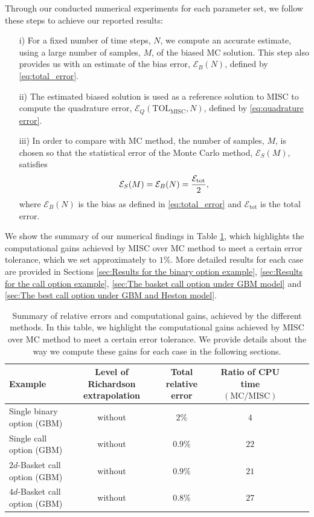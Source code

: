 Through our conducted numerical experiments for each parameter set, we follow these steps to achieve our reported results:
\begin{enumerate}
\item[i)] For a fixed number of time steps, $N$, we compute an accurate estimate, using a large number of samples, $M$, of the biased  MC solution. This step also provides us with an estimate of the bias error, $\mathcal{E}_B(N)$, defined by \eqref{eq:total_error}. 
\item[ii)] The estimated  biased solution is used as a reference solution  to MISC to compute the quadrature error, $\mathcal{E}_Q(\text{TOL}_{\text{MISC}},N)$, defined by \eqref{eq:quadrature error}.
\item[iii)] In order to compare with MC method, the number of samples, $M$, is chosen so that  the statistical error of the Monte Carlo  method, $\mathcal{E}_S(M)$, satisfies
\begin{align}\label{optimal_number_samples}
\mathcal{E}_S(M)= \mathcal{E}_B(N)=\frac{\mathcal{E}_{\text{tot}}}{2},
\end{align}
where $\mathcal{E}_B(N)$ is the bias as defined in \eqref{eq:total_error} and
$\mathcal{E}_{\text{tot}}$ is the total error. 
\end{enumerate}
We show  the summary of our numerical findings in Table \ref{table:Summary of our numerical results.}, which  highlights the computational gains achieved by MISC over MC method to meet a certain error tolerance, which we set approximately to $1\%$. More detailed results for each case  are provided in  Sections \ref{sec:Results for the binary option example}, \ref{sec:Results for the call option example}, \ref{sec:The basket call option  under GBM  model} and \ref{sec:The best call option  under GBM and Heston model}. 
\FloatBarrier
\begin{table}[!h]
	\centering
	\begin{small}
	\begin{tabular}{l*{4}{c}r}
	\toprule[1.5pt]
		Example          & Level of Richardson extrapolation    &  Total relative error  & Ratio of CPU time  $\left(\text{MC}/ \text{MISC} \right)$ \\
		\hline
			  Single binary option (GBM) & without  &  $2 \%$&  $ 4$ \\	
              \hline
            Single call option (GBM)  & without    &  $0.9\%$&  $22$ \\
				 \hline
					$2d$-Basket call option (GBM)  & without    &  $$0.9\%$$&  $21$ \\	
					\hline
					$4d$-Basket call option (GBM)  & without    &  $$0.8\%$$&  $27$ \\	
		\bottomrule[1.25pt]
	\end{tabular}
\end{small}
	\caption{Summary of relative errors and computational gains, achieved by the different methods. In this table, we highlight the computational gains achieved by MISC over MC method to meet a certain error tolerance. We provide details about the way we compute these gains for each case in the following sections.}
	\label{table:Summary of our numerical results.}
\end{table}
